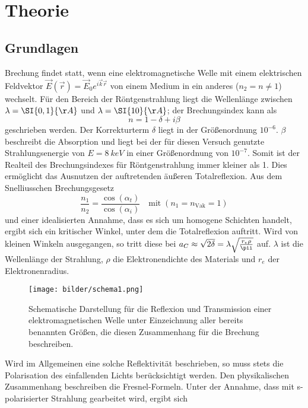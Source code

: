 \section{Theorie}
\subsection{Grundlagen}
Brechung findet statt, wenn eine elektromagnetische Welle mit einem elektrischen Feldvektor $\vec{E}(\vec{r})=\vec{E}_0e^{i\vec{k}\vec{r}}$ von einem Medium in ein anderes ($n_2=n\neq1$) wechselt. Für den Bereich der Röntgenstrahlung liegt die Wellenlänge zwischen $\lambda=\SI{0,1}{\AA}$ und $\lambda=\SI{10}{\AA}$; der Brechungsindex kann als
\begin{equation*}
  n=1-\delta+i\beta
  \label{eq:brechungsindex}
\end{equation*}
geschrieben werden. Der Korrekturterm $\delta$ liegt in der Größenordnung $10^{-6}$. $\beta$ beschreibt die Absorption und liegt bei der für diesen Versuch genutzte Strahlungsenergie von $E=\SI{8}{keV}$ in einer Größenordnung von $10^{-7}$. Somit ist der Realteil des Brechungsindexes für Röntgenstrahlung immer kleiner als 1. Dies ermöglicht das Ausnutzen der auftretenden äußeren Totalreflexion. Aus dem Snelliusschen Brechungsgesetz
\begin{equation*}
\frac{n_1}{n_2}=\frac{\cos(\alpha_t)}{\cos(\alpha_i)}\quad\text{mit}\; (n_1=n_\text{Vak}=1)
\label{eq:snellius}
\end{equation*}
 und einer idealisierten Annahme, dass es sich um homogene Schichten handelt, ergibt sich ein kritischer Winkel, unter dem die Totalreflexion auftritt. Wird von kleinen Winkeln ausgegangen, so tritt diese bei $a_C\approx\sqrt{2\delta}=\lambda\sqrt{\frac{r_e\rho}{\pii}}$
 auf. $\lambda$ ist die Wellenlänge der Strahlung, $\rho$ die Elektronendichte des Materials und $r_e$ der Elektronenradius.
 \begin{figure}[H]
   \centering
   \texttt{[image: bilder/schema1.png]}
   \caption{Schematische Darstellung für die Reflexion und Transmission einer elektromagnetischen Welle unter Einzeichnung aller bereits benannten Größen, die diesen Zusammenhang für die Brechung beschreiben\cite{anleitung}.}
   \label{schema1}
 \end{figure}
Wird im Allgemeinen eine solche Reflektivität beschrieben, so muss stets die Polarisation des einfallenden Lichts berücksichtigt werden. Den physikalischen Zusammenhang beschreiben die Fresnel-Formeln. Unter der Annahme, dass mit s-polarisierter Strahlung gearbeitet wird, ergibt sich
